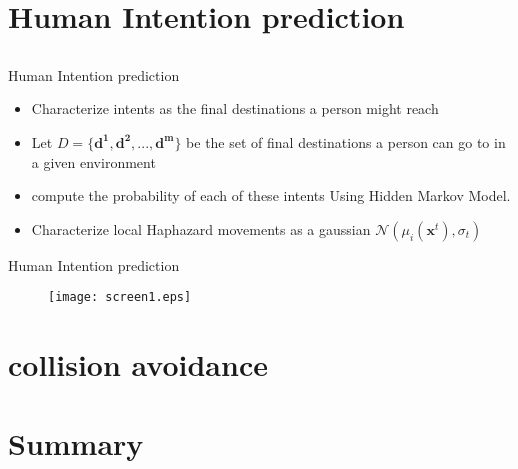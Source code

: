 \documentclass{beamer}
\begin{document}
\section{Human Intention prediction}

\subsection{}

\begin{frame}{Human Intention prediction}
\begin{itemize}
\item{Characterize intents as the final destinations a person might reach}
\item{Let $D = \{\mathbf{d^1,d^2,...,d^m}\}$ be the set of final destinations a person can go to in a given environment}
\item{compute the probability of each of these intents Using Hidden Markov Model.}
\item{Characterize local Haphazard movements as a gaussian $\mathcal{N}(\mu_i(\mathbf{x}^{t}),\sigma_t)$ }
\end{itemize}
\end{frame}
\begin{frame}{Human Intention prediction}
\begin{figure}
\centering
\texttt{[image: screen1.eps]}
\end{figure}
\end{frame}

\section{collision avoidance}
\section*{Summary}
\end{document}
